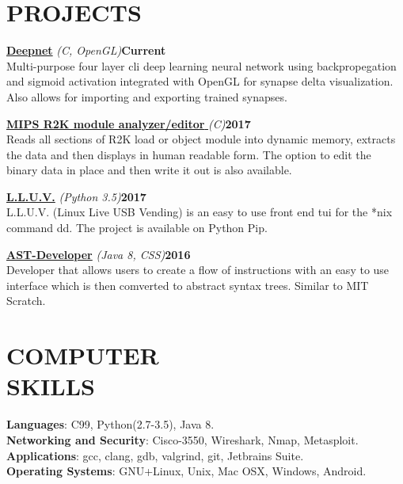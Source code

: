 \documentclass[line,margin]{res}
\begin{document}
\begin{resume}
\section{PROJECTS}
\par
    \href{https://github.com/jmp1617/deepnet.git}{\textbf{Deepnet}}
    {\sl (C, OpenGL)}\hfill \textbf{Current}\\ 
    Multi-purpose four layer cli deep learning neural network using 
    backpropegation and sigmoid activation integrated with OpenGL for synapse 
    delta visualization. Also allows for importing and exporting trained 
    synapses.
\par
    \href{https://github.com/jmp1617/lmedit.git}
    {\textbf{MIPS R2K module analyzer/editor }}{\sl (C)}\hfill \textbf{2017}\\
    Reads all sections of R2K load or object module into dynamic memory, 
    extracts the data and then displays in human readable form. The option to 
    edit the binary data in place and then write it out is also available.
\par
    \href{https://github.com/jmp1617/LLUV.git}{\textbf{L.L.U.V.}}
    {\sl (Python 3.5)}\hfill \textbf{2017}\\ 
    L.L.U.V. (Linux Live USB Vending) is an easy to use front end tui for the 
    *nix command dd. The project is available on Python Pip.
\par
    \href{https://github.com/jmp1617/ast-developer.git}{\textbf{AST-Developer}}
    {\sl (Java 8, CSS)}\hfill \textbf{2016}\\ 
    Developer that allows users to create a flow of instructions with an easy to
    use interface which is then comverted to abstract syntax trees. Similar to 
    MIT Scratch.

\section{COMPUTER\\SKILLS}
\textbf{Languages}: C99, Python(2.7-3.5), Java 8.
\\
\textbf{Networking and Security}: Cisco-3550, Wireshark, Nmap, Metasploit.  
\\
\textbf{Applications}: gcc, clang, gdb, valgrind, git, Jetbrains Suite. 
\\
\textbf{Operating Systems}: 
GNU+Linux, Unix, Mac OSX, Windows, Android.


\end{resume}
\end{document}
